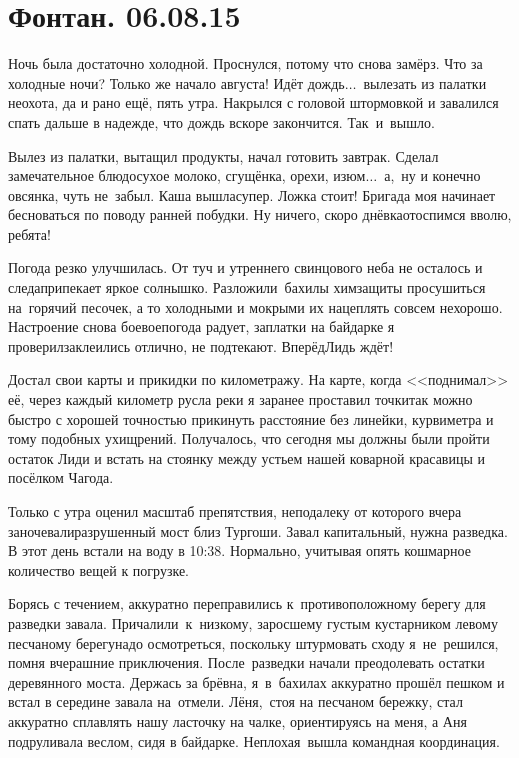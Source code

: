 \chapter{Фонтан. 06.08.15}
\vepsianrose

Ночь была достаточно холодной. Проснулся, потому что снова замёрз. Что за холодные ночи? Только же начало августа! Идёт дождь$\ldots$~вылезать из палатки неохота, да и рано ещё, пять утра. Накрылся с головой штормовкой и завалился спать дальше в надежде, что дождь вскоре закончится. Так~и~вышло. 

Вылез из палатки, вытащил продукты, начал готовить завтрак. Сделал замечательное блюдо\mdash сухое молоко, сгущёнка, орехи, изюм$\ldots$~а,~ну и конечно овсянка, чуть не~забыл. Каша вышла\mdash супер. Ложка стоит! Бригада моя начинает бесноваться по поводу ранней побудки. Ну ничего, скоро днёвка\mdash отоспимся вволю, ребята! 

Погода резко улучшилась. От туч и утреннего свинцового неба не осталось и следа\mdash припекает яркое солнышко. Разложили~бахилы химзащиты просушиться на~горячий песочек, а то холодными и мокрыми их нацеплять совсем нехорошо. Настроение снова боевое\mdash погода радует, заплатки на байдарке я проверил\mdash заклеились отлично, не подтекают. Вперёд\mdash Лидь ждёт! 

Достал свои карты и прикидки по километражу. На карте, когда <<поднимал>> её, через каждый километр русла реки я заранее проставил точки\mdash так можно быстро с хорошей точностью прикинуть расстояние без линейки, курвиметра и тому подобных ухищрений. Получалось, что сегодня мы должны были пройти остаток Лиди и встать на стоянку между устьем нашей коварной красавицы и посёлком Чагода.

Только с утра оценил масштаб препятствия, неподалеку от которого вчера заночевали\mdash разрушенный мост близ Тургоши. Завал капитальный, нужна разведка. В этот день встали на воду в 10:38. Нормально, учитывая опять кошмарное количество вещей к погрузке. 

Борясь с течением, аккуратно переправились к~противоположному берегу для разведки завала. Причалили~к~низкому, заросшему густым кустарником левому песчаному берегу\mdash надо осмотреться, поскольку штурмовать сходу я~не~решился, помня вчерашние приключения. После~разведки начали преодолевать остатки деревянного моста. Держась за брёвна, я~в~бахилах аккуратно прошёл пешком и встал в середине завала на~отмели. Лёня,~стоя на песчаном бережку, стал аккуратно сплавлять нашу ласточку на чалке, ориентируясь на меня, а Аня подруливала веслом, сидя в байдарке. Неплохая~вышла командная координация. 

